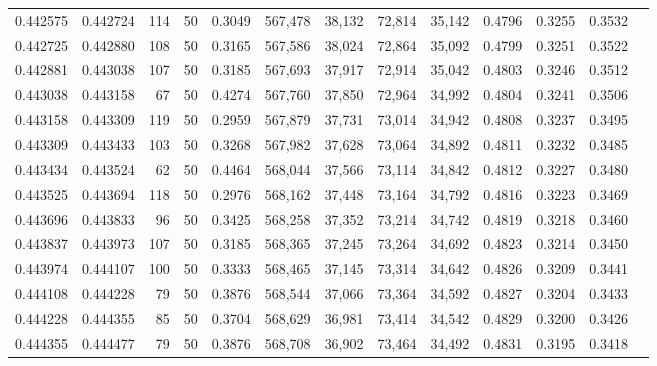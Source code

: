\begin{tabular}{rrrrrrrrrrrrr}
0.442575 & 0.442724 &   114 &  50 &                                     0.3049 & 567,478 &  38,132 &  72,814 &  35,142 & 0.4796 & 0.3255 & 0.3532 \\
0.442725 & 0.442880 &   108 &  50 &                                     0.3165 & 567,586 &  38,024 &  72,864 &  35,092 & 0.4799 & 0.3251 & 0.3522 \\
0.442881 & 0.443038 &   107 &  50 &                                     0.3185 & 567,693 &  37,917 &  72,914 &  35,042 & 0.4803 & 0.3246 & 0.3512 \\
0.443038 & 0.443158 &    67 &  50 &                                     0.4274 & 567,760 &  37,850 &  72,964 &  34,992 & 0.4804 & 0.3241 & 0.3506 \\
0.443158 & 0.443309 &   119 &  50 &                                     0.2959 & 567,879 &  37,731 &  73,014 &  34,942 & 0.4808 & 0.3237 & 0.3495 \\
0.443309 & 0.443433 &   103 &  50 &                                     0.3268 & 567,982 &  37,628 &  73,064 &  34,892 & 0.4811 & 0.3232 & 0.3485 \\
0.443434 & 0.443524 &    62 &  50 &                                     0.4464 & 568,044 &  37,566 &  73,114 &  34,842 & 0.4812 & 0.3227 & 0.3480 \\
0.443525 & 0.443694 &   118 &  50 &                                     0.2976 & 568,162 &  37,448 &  73,164 &  34,792 & 0.4816 & 0.3223 & 0.3469 \\
0.443696 & 0.443833 &    96 &  50 &                                     0.3425 & 568,258 &  37,352 &  73,214 &  34,742 & 0.4819 & 0.3218 & 0.3460 \\
0.443837 & 0.443973 &   107 &  50 &                                     0.3185 & 568,365 &  37,245 &  73,264 &  34,692 & 0.4823 & 0.3214 & 0.3450 \\
0.443974 & 0.444107 &   100 &  50 &                                     0.3333 & 568,465 &  37,145 &  73,314 &  34,642 & 0.4826 & 0.3209 & 0.3441 \\
0.444108 & 0.444228 &    79 &  50 &                                     0.3876 & 568,544 &  37,066 &  73,364 &  34,592 & 0.4827 & 0.3204 & 0.3433 \\
0.444228 & 0.444355 &    85 &  50 &                                     0.3704 & 568,629 &  36,981 &  73,414 &  34,542 & 0.4829 & 0.3200 & 0.3426 \\
0.444355 & 0.444477 &    79 &  50 &                                     0.3876 & 568,708 &  36,902 &  73,464 &  34,492 & 0.4831 & 0.3195 & 0.3418 \\

\end{tabular}
